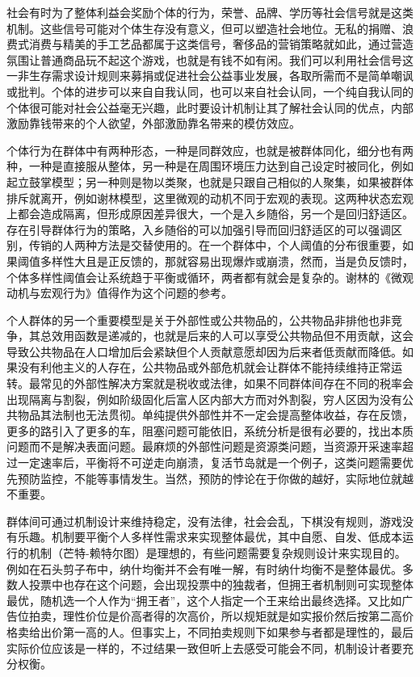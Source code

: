 \documentclass[]{tufte-book}
\begin{document}
社会有时为了整体利益会奖励个体的行为，荣誉、品牌、学历等社会信号就是这类机制。这些信号可能对个体生存没有意义，但可以塑造社会地位。无私的捐赠、浪费式消费与精美的手工艺品都属于这类信号，奢侈品的营销策略就如此，通过营造氛围让普通商品玩不起这个游戏，也就是有钱不如有闲。我们可以利用社会信号这一非生存需求设计规则来募捐或促进社会公益事业发展，各取所需而不是简单嘲讽或批判。个体的进步可以来自自我认同，也可以来自社会认同，一个纯自我认同的个体很可能对社会公益毫无兴趣，此时要设计机制让其了解社会认同的优点，内部激励靠钱带来的个人欲望，外部激励靠名带来的模仿效应。

个体行为在群体中有两种形态，一种是同群效应，也就是被群体同化，细分也有两种，一种是直接服从整体，另一种是在周围环境压力达到自己设定时被同化，例如起立鼓掌模型；另一种则是物以类聚，也就是只跟自己相似的人聚集，如果被群体排斥就离开，例如谢林模型，这里微观的动机不同于宏观的表现。这两种状态宏观上都会造成隔离，但形成原因差异很大，一个是入乡随俗，另一个是回归舒适区。存在引导群体行为的策略，入乡随俗的可以加强引导而回归舒适区的可以强调区别，传销的人两种方法是交替使用的。在一个群体中，个人阈值的分布很重要，如果阈值多样性大且是正反馈的，那就容易出现爆炸或崩溃，然而，当是负反馈时，个体多样性阈值会让系统趋于平衡或循环，两者都有就会是复杂的。谢林的《微观动机与宏观行为》值得作为这个问题的参考。

个人群体的另一个重要模型是关于外部性或公共物品的，公共物品非排他也非竞争，其总效用函数是递减的，也就是后来的人可以享受公共物品但不用贡献，这会导致公共物品在人口增加后会紧缺但个人贡献意愿却因为后来者低贡献而降低。如果没有利他主义的人存在，公共物品或外部危机就会让群体不能持续维持正常运转。最常见的外部性解决方案就是税收或法律，如果不同群体间存在不同的税率会出现隔离与割裂，例如阶级固化后富人区内部大方而对外割裂，穷人区因为没有公共物品其法制也无法贯彻。单纯提供外部性并不一定会提高整体收益，存在反馈，更多的路引入了更多的车，阻塞问题可能依旧，系统分析是很有必要的，找出本质问题而不是解决表面问题。最麻烦的外部性问题是资源类问题，当资源开采速率超过一定速率后，平衡将不可逆走向崩溃，复活节岛就是一个例子，这类问题需要优先预防监控，不能等事情发生。当然，预防的悖论在于你做的越好，实际地位就越不重要。

群体间可通过机制设计来维持稳定，没有法律，社会会乱，下棋没有规则，游戏没有乐趣。机制要平衡个人多样性需求来实现整体最优，其中自愿、自发、低成本运行的机制（芒特-赖特尔图）是理想的，有些问题需要复杂规则设计来实现目的。例如在石头剪子布中，纳什均衡并不会有唯一解，有时纳什均衡不是整体最优。多数人投票中也存在这个问题，会出现投票中的独裁者，但拥王者机制则可实现整体最优，随机选一个人作为``拥王者''，这个人指定一个王来给出最终选择。又比如广告位拍卖，理性价位是价高者得的次高价，所以规矩就是如实报价然后按第二高价格卖给出价第一高的人。但事实上，不同拍卖规则下如果参与者都是理性的，最后实际价位应该是一样的，不过结果一致但听上去感受可能会不同，机制设计者要充分权衡。
\end{document}
